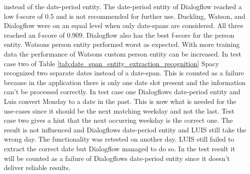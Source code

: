 instead of the date-period entity.
The date-period entity of Dialogflow reached a low f-score of 0.5 and is not recommended for further use. 
Duckling, Watson, and Dialogflow were on an equal level when only date-spans are considered. 
All three reached an f-score of 0.909.
Dialogflow also has the best f-score for the person entity.
Watsons person entity performed worst as expected.
With more training data the performance of Watsons custom person 
entity can be increased.
In test case two of Table \ref{tab:date_span_entity_extraction_recognition} Spacy 
recognized two separate dates instead of a date-span.
This is counted as a failure because in the application there is only one date slot present
and the information can't be processed correctly.
In test case one Dialogflows date-period entity and Luis convert Monday to a date in the past.
This is now what is needed for the use-cases since it should be the next matching 
weekday and not the last.
Test case two gives a hint that the next occurring weekday is the correct one.
The result is not influenced and Dialogflows date-period entity and LUIS still take the wrong day.
The functionality was retested on another day.
LUIS still failed to extract the correct date but Dialogflow 
managed to do so.
In the test result it will be counted as a failure of Dialogflows date-period entity
since it doesn't deliver reliable results.

